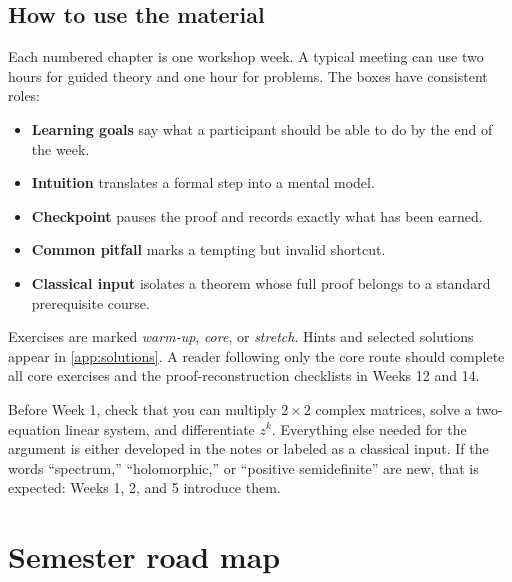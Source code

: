 \documentclass[11pt,oneside,openany]{book}
\theoremstyle{definition}
\theoremstyle{remark}
\begin{document}
\section*{How to use the material}

Each numbered chapter is one workshop week.  A typical meeting can use
two hours for guided theory and one hour for problems.  The boxes have
consistent roles:

\begin{itemize}
  \item \textbf{Learning goals} say what a participant should be able
  to do by the end of the week.
  \item \textbf{Intuition} translates a formal step into a mental model.
  \item \textbf{Checkpoint} pauses the proof and records exactly what
  has been earned.
  \item \textbf{Common pitfall} marks a tempting but invalid shortcut.
  \item \textbf{Classical input} isolates a theorem whose full proof
  belongs to a standard prerequisite course.
\end{itemize}

Exercises are marked \emph{warm-up}, \emph{core}, or \emph{stretch}.
Hints and selected solutions appear in \cref{app:solutions}.  A reader
following only the core route should complete all core exercises and
the proof-reconstruction checklists in Weeks 12 and 14.

\begin{intuitionbox}
Before Week 1, check that you can multiply \(2\times2\) complex
matrices, solve a two-equation linear system, and differentiate
\(z^k\).  Everything else needed for the argument is either developed
in the notes or labeled as a classical input.  If the words
``spectrum,'' ``holomorphic,'' or ``positive semidefinite'' are new,
that is expected: Weeks 1, 2, and 5 introduce them.
\end{intuitionbox}

\tableofcontents

\chapter*{Semester road map}
\end{document}
